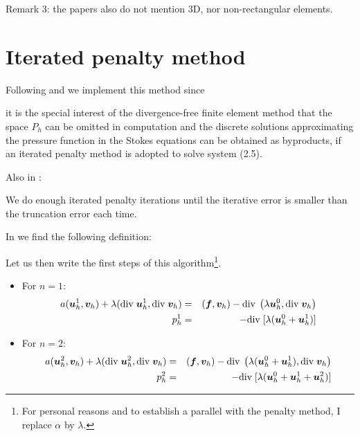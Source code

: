 Remark 3: the papers also do not mention 3D, nor non-rectangular elements. 

\section*{Iterated penalty method}

Following \textcite{zhan09} and \textcite{huzh11} we implement this method since

\begin{displayquote}
{\color{darkgray}
it is the special interest
of the divergence-free ﬁnite element method that the space $P_h$ can be omitted
in computation and the discrete solutions approximating the pressure function
in the Stokes equations can be obtained as byproducts, if an iterated penalty
method is adopted to solve system (2.5).}
\end{displayquote}

Also in \textcite{huzh11}:
\begin{displayquote}
{\color{darkgray}
We do enough iterated penalty iterations until the iterative error is smaller
than the truncation error each time.}
\end{displayquote}

In \textcite{zhan09} we find the following definition:
\begin{center}
\end{center}

Let us then write the first steps of this algorithm\footnote{For personal reasons
and to establish a parallel with the penalty method, I replace $\alpha$ by $\lambda$.}.
\begin{itemize}
\item
For $n=1$:
\begin{eqnarray}
a({\bm u}_h^1,{\bm v}_h) + \lambda (\text{div}\; {\bm u}_h^1, \text{div}\; {\bm v}_h) 
&=& ({\bm f} , {\bm v}_h) - \text{div}\; \left( \lambda {\bm u}_h^0 , \text{div}\; {\bm v}_h \right) \nonumber\\
p_h^1 &=& - \text{div}\; [\lambda ( {\bm u}_h^0 + {\bm u}_h^1 )]
\end{eqnarray}
\item 
For $n=2$:
\begin{eqnarray}
a({\bm u}_h^2,{\bm v}_h) + \lambda (\text{div}\; {\bm u}_h^2, \text{div}\; {\bm v}_h) 
&=& ({\bm f} , {\bm v}_h) - \text{div}\; \left( \lambda ({\bm u}_h^0 +{\bm u}_h^1 ), \text{div}\; {\bm v}_h \right) \nonumber\\
p_h^2 &=& - \text{div}\; [\lambda ( {\bm u}_h^0 + {\bm u}_h^1 + {\bm u}_h^2)]
\end{eqnarray}
\end{itemize}

